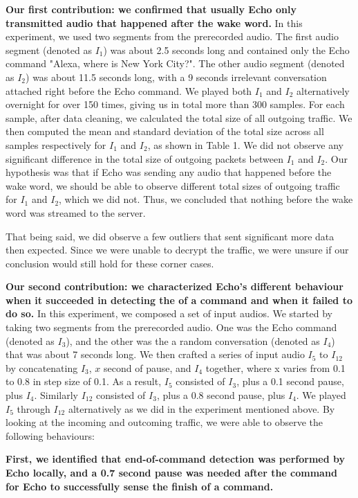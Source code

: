 \textbf{Our first contribution: we confirmed that usually Echo only transmitted audio that happened after the wake word.} In this experiment, we used two segments from the prerecorded audio. The first audio segment (denoted as $I_1$) was about 2.5 seconds long and contained only the Echo command "Alexa, where is New York City?". The other audio segment (denoted as $I_2$) was about 11.5 seconds long, with a 9 seconds irrelevant conversation attached right before the Echo command. We played both $I_1$ and $I_2$ alternatively overnight for over 150 times, giving us in total more than 300 samples. For each sample, after data cleaning, we calculated the total size of all outgoing traffic. We then computed the mean and standard deviation of the total size across all samples respectively for $I_1$ and $I_2$, as shown in Table 1. We did not observe any significant difference in the total size of outgoing packets between $I_1$ and $I_2$. Our hypothesis was that if Echo was sending any audio that happened before the wake word, we should be able to observe different total sizes of outgoing traffic for $I_1$ and $I_2$, which we did not. Thus, we concluded that nothing before the wake word was streamed to the server.

That being said, we did observe a few outliers that sent significant more data then expected. Since we were unable to decrypt the traffic, we were unsure if our conclusion would still hold for these corner cases.

\textbf{Our second contribution: we characterized Echo's different behaviour when it succeeded in detecting the of a command and when it failed to do so.} In this experiment, we composed a set of input audios. We started by taking two segments from the prerecorded audio. One was the Echo command (denoted as $I_3$), and the other was the a random conversation (denoted as $I_4$) that was about 7 seconds long. We then crafted a series of input audio $I_5$ to $I_{12}$ by concatenating $I_3$, $x$ second of pause, and $I_4$ together, where x varies from 0.1 to 0.8 in step size of 0.1. As a result, $I_5$ consisted of $I_3$, plus a 0.1 second pause, plus $I_4$. Similarly $I_{12}$ consisted of $I_3$, plus a 0.8 second pause, plus $I_4$. We played $I_5$ through $I_{12}$ alternatively as we did in the experiment mentioned above. By looking at the incoming and outcoming traffic, we were able to observe the following behaviours: 

\textbf{First, we identified that end-of-command detection was performed by Echo locally, and a 0.7 second pause was needed after the command for Echo to successfully sense the finish of a command.}  

